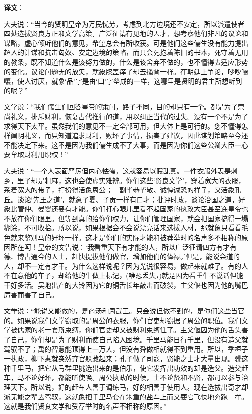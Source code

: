 \documentclass[12pt,UTF-8,openany]{ctexbook}
\begin{document}
\newpage

\textbf{译文}：

\vspace{1em}

\begin{normalsize}
    
    大夫说：“当今的贤明皇帝为万民忧劳，考虑到北方边境还不安定，所以派遣使者四处选拔贤良方正和文学高策，广泛征请有见地的人才，想考察他们非凡的议论和谋略，虚心倾听他们的意见，希望总会有所收获。可是他们这些儒生没有能力提出超人的计谋和抗击匈奴、安定边境的策略，而只会死抱着陈旧的书本，死守着无用的教条，既不知道什么是该努力做的，什么是该舍弃不做的，也不懂得去适应形势的变化。议论问题无的放矢，就象膝盖痒了却去搔背一样。在朝廷上争论，吵吵嚷嚷，使人讨厌，就象‘品’字是由‘口’字垒成的一样，这哪里是贤明的君主所想听到的呢？”
    
    文学说：“我们儒生们回答皇帝的策问，路子不同，目的却只有一个。都是为了崇尚礼义，排斥财利，恢复古代推行的道，用以纠正当代的过失。没有一个不是为了求得天下太平。虽然我们的意见不一定全部可用，但大体上是可行的。您不懂得怎样阐明礼义，而只知道追求财利，败坏了事情，损害了建议，因此谋划策略至今还不能决定下来。这不是因为我们儒生成不了大事，而是因为你们这些公卿大臣一心要牟取财利用职权！”
    
    大夫说：“一个人表面严厉但内心怯儒，这就容易以假乱真。一件衣服外表是刺乡，里子却是粗麻，这也会使虚实难辨。你们这些‘贤良文学’，穿着宽大的衣服，系着宽大的带子，打扮得活象周公；一副毕恭毕敬、诚惶诚恐的样子，又活象孔丘。谈论‘先王之道’，就象子夏、子贡一样有口才；批评时政，谈论治国之道，好象比管仲、晏婴还要有才能。你们打心眼儿里看不起国家的执政大臣甚至连皇帝也不放在你们眼里。但等到真的给你们权力，让你们管理国家，就会把国家搞得一塌糊涂，不可收拾。所以说，如果根据会不会说漂亮话来选拔人材，那就象只看看毛色就来鉴别马的好坏一样。这才是你们的实际才能和被荐举时的名声多不相称的原因所在呵！皇帝的文告说：‘我看重天下有才能的人，所以广泛征请四方有才有德、博古通今的人士，赶快提拔他们做官，增加他们的俸禄。’但是，能说会道的人，却不一定有才干。为什么这样说呢？因为光说很容易，做起来就难了。有的人不在意他的车子，却给他的牛做上标记，(唯恐丢失，)就是因为看重牛不说话但能干好多活。吴地出产的大铃因为它的铜舌长年敲击而破裂，主父偃也因为他的嘴巴厉害而害了自己。
    
    文学说：“能说又能做的，是商汤和周武王。只会说但做不到的，是你们这些当官的。如果说我们文学窃取的是周公的衣服，你们官吏却窃据了周公的职位。我们文学被儒家的老一套所束缚，你们官吏却又被财利束缚住了。主父偃因为他的舌头害了自己，你们却是为了财利而使自己陷入困境。千里马能日行千里，但没有造父就驾驭不了；禹的智慧能顶得上一万人，但没有舜做相就得不到重用。所以，季桓子一执政，柳下惠就突然弃官躲藏起来；孔子做了司寇，贤能之士才大量出现。骥这种千里马，把它从马群里挑选出来的是伯乐，使它发挥出功效的却是造父。造父赶车，马不论好坏，都能听使唤。周公执政的时候，士不论贤和不贤，都可以参与治理天下。所以说，好的赶车人善于调练马，好的相善于使用人。现在选拔出奇才却派无能之辈去驾驭，这就象把千里马套在笨重的盐车上而又要它飞快地奔跑一样。这就是我们贤良文学和受荐举时的名声不相称的原因。”
    

\end{normalsize}
\end{document}
